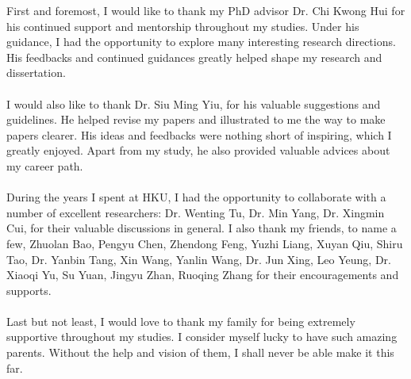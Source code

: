 \def\CTeXPreproc{Created by ctex v0.2.14, don't edit!}
\vspace{-5mm}

\noindent First and foremost, I would like to thank my PhD advisor Dr. Chi Kwong
Hui for his continued support and mentorship throughout my studies. Under his
guidance, I had the opportunity to explore many interesting research directions.
His feedbacks and continued guidances greatly helped shape my research and
dissertation.\\
\\
I would also like to thank Dr. Siu Ming Yiu, for his valuable suggestions and
guidelines. He helped revise my papers and illustrated to me the way to make
papers clearer. His ideas and feedbacks were nothing short of inspiring, which I
greatly enjoyed. Apart from my study, he also provided valuable advices about my
career path.\\
\\
During the years I spent at HKU, I had the opportunity to collaborate with a
number of excellent researchers: Dr. Wenting Tu, Dr. Min Yang, Dr. Xingmin Cui,
for their valuable discussions in general. I also thank my friends, to name a
few, Zhuolan Bao, Pengyu Chen, Zhendong Feng, Yuzhi Liang, Xuyan Qiu, Shiru Tao,
Dr. Yanbin Tang, Xin Wang, Yanlin Wang, Dr. Jun Xing, Leo Yeung, Dr. Xiaoqi Yu,
Su Yuan, Jingyu Zhan, Ruoqing Zhang for their encouragements and supports.\\
\\ 
Last but not least, I would love to thank my family for being extremely
supportive throughout my studies. I consider myself lucky to have such amazing
parents. Without the help and vision of them, I shall never be able make it this
far.
